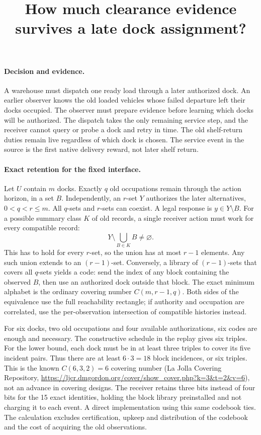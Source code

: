 \documentclass{article}
\title{How much clearance evidence survives a late dock assignment?}
\begin{document}
\maketitle
\paragraph{Decision and evidence.}
A warehouse must dispatch one ready load through a later authorized dock. An earlier observer knows the old loaded vehicles whose failed departure left their docks occupied. The observer must prepare evidence before learning which docks will be authorized. The dispatch takes the only remaining service step, and the receiver cannot query or probe a dock and retry in time. The old shelf-return duties remain live regardless of which dock is chosen. The service event in the source is the first native delivery reward, not later shelf return.

\paragraph{Exact retention for the fixed interface.}
Let \(U\) contain \(m\) docks. Exactly \(q\) old occupations remain through the action horizon, in a set \(B\). Independently, an \(r\)-set \(Y\) authorizes the later alternatives, \(0<q<r\le m\). All \(q\)-sets and \(r\)-sets can coexist. A legal response is \(y\in Y\setminus B\). For a possible summary class \(K\) of old records, a single receiver action must work for every compatible record:
\[
             Y\setminus\bigcup_{B\in K} B\ne\varnothing .
\]
This has to hold for every \(r\)-set, so the union has at most \(r-1\) elements. Any such union extends to an \((r-1)\)-set. Conversely, a library of \((r-1)\)-sets that covers all \(q\)-sets yields a code: send the index of any block containing the observed \(B\), then use an authorized dock outside that block. The exact minimum alphabet is the ordinary covering number \(C(m,r-1,q)\). Both sides of the equivalence use the full reachability rectangle; if authority and occupation are correlated, use the per-observation intersection of compatible histories instead.

For six docks, two old occupations and four available authorizations, six codes are enough and necessary. The constructive schedule in the replay gives six triples. For the lower bound, each dock must be in at least three triples to cover its five incident pairs. Thus there are at least \(6\cdot3=18\) block incidences, or six triples. This is the known \(C(6,3,2)=6\) covering number (La Jolla Covering Repository, \url{https://ljcr.dmgordon.org/cover/show_cover.php?k=3&t=2&v=6}), not an advance in covering designs. The receiver retains three bits instead of four bits for the 15 exact identities, holding the block library preinstalled and not charging it to each event. A direct implementation using this same codebook ties. The calculation excludes certification, upkeep and distribution of the codebook and the cost of acquiring the old observations.
\end{document}
